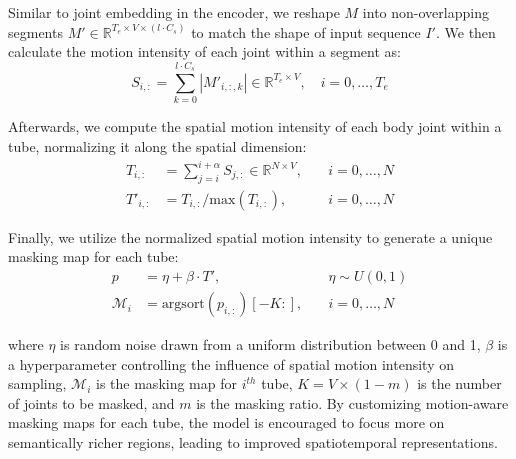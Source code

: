 Similar to joint embedding in the encoder, we reshape $M$ into non-overlapping
segments $M' \in \mathbb{R}^{T_{e} \times V \times (l \cdot C_{s})}$ to match the
shape of input sequence $I'$. We then calculate the motion intensity of each joint
within a segment as:
\begin{equation}  
    \label{eq:motion_intensity}
    S_{i,:} = \sum_{k=0}^{l\cdot C_{s}}|M'_{i,:,k}| \in \mathbb{R}^{T_{e} \times V}, \quad i=0,\dots,T_{e}
\end{equation}

Afterwards, we compute the spatial motion intensity of each body joint within a tube,
normalizing it along the spatial dimension:  
\begin{equation}
    \label{eq:tube_motion_intensity_norm}
    \begin{aligned}
        T_{i,:} &= \sum_{j=i}^{i+\alpha}S_{j,:} \in \mathbb{R}^{N \times V}, \quad &i=0,\dots,N \\
        T'_{i,:} &= T_{i,:} / \text{max}(T_{i,:}), \quad &i=0,\dots,N  
    \end{aligned}
\end{equation}

Finally, we utilize the normalized spatial motion intensity to generate a unique
masking map for each tube:
\begin{equation} 
    \label{eq:mask_sampling}
    \begin{aligned}
        p &= \eta + \beta \cdot T', \quad &\eta \sim U(0,1) \\  
        \mathcal{M}_{i} &= \text{argsort}(p_{i,:})[-K:], \quad &i=0,\dots,N
    \end{aligned}
\end{equation}

\noindent where $\eta$ is random noise drawn from a uniform distribution between
0 and 1, $\beta$ is a hyperparameter controlling the influence of spatial motion
intensity on sampling, $\mathcal{M}_{i}$ is the masking map for $i^{th}$ tube,
$K=V\times (1-m)$ is the number of joints to be masked, and $m$ is the masking ratio.
By customizing motion-aware masking maps for each tube, the model is encouraged
to focus more on semantically richer regions, leading to improved spatiotemporal representations.


